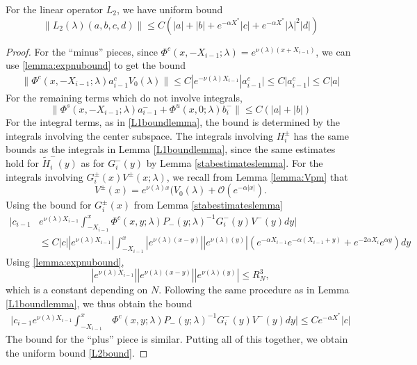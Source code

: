 \documentclass[thesis.tex]{subfiles}
\begin{document}
\begin{lemma}\label{L2boundlemma}
For the linear operator $L_2$, we have uniform bound
\begin{equation}\label{L2bound}
\| L_2(\lambda) (a,b,c,d) \| \leq C\left(|a| + |b| + e^{-\alpha X^*} |c| + e^{-\alpha X^*}|\lambda|^2|d|\right)
\end{equation}
\begin{proof}
For the ``minus'' pieces, since $\Phi^c(x, -X_{i-1}; \lambda) = e^{\nu(\lambda)(x + X_{i-1})}$, we can use \cref{lemma:expnubound} to get the bound
\begin{align*}
\| \Phi^c(x, -X_{i-1}; \lambda) a_{i-1}^c V_0(\lambda) \| \leq C |e^{-\nu(\lambda)X_{i-1}}|a_{i-1}^c| \leq C |a_{i-1}^c| \leq C |a|
\end{align*}
For the remaining terms which do not involve integrals,
\[
\| \Phi^s(x, -X_{i-1}; \lambda) a_{i-1}^- + \Phi^u(x, 0; \lambda) b_i^- \| \leq C(|a| + |b|)
\]
For the integral terms, as in \cref{L1boundlemma}, the bound is determined by the integrals involving the center subspace. The integrals involving $H_i^\pm$ has the same bounds as the integrals in Lemma \ref{L1boundlemma}, since the same estimates hold for $\tilde{H}_i^-(y)$ as for $G_i^-(y)$ by Lemma \ref{stabestimateslemma}. For the integrals involving $G_i^\pm(x) V^\pm(x; \lambda)$, we recall from Lemma \ref{lemma:Vpm} that
\[
V^\pm(x) = e^{\nu(\lambda)x}(V_0(\lambda) + \mathcal{O}(e^{-\alpha |x| }).
\]
Using the bound for $G_i^\pm(x)$ from Lemma \ref{stabestimateslemma}
\begin{align*}
\Bigg| c_{i-1} &e^{\nu(\lambda)X_{i-1}} \int_{-X_{i-1}}^x \Phi^c(x, y; \lambda) P_-(y; \lambda)^{-1} G_i^-(y) V^-(y) dy \Bigg| \\ 
&\leq C |c| \left| e^{\nu(\lambda)X_{i-1}} \right| \int_{-X_{i-1}}^x \left| e^{\nu(\lambda)(x - y)} \right| \left|e^{\nu(\lambda)(y)}\right| \left( e^{-\alpha X_{i-1}} e^{-\alpha(X_{i-1} + y) } + e^{-2 \alpha X_i} e^{\alpha y} \right) dy
\end{align*}
Using \cref{lemma:expnubound}, 
\[
\left| e^{\nu(\lambda)X_{i-1}} \right| \left| e^{\nu(\lambda)(x - y)} \right| \left|e^{\nu(\lambda)(y)}\right| \leq R_N^3,
\]
which is a constant depending on $N$. Following the same procedure as in Lemma \ref{L1boundlemma}, we thus obtain the bound
\begin{align}\label{intGVpmbound}
\Bigg| c_{i-1} e^{\nu(\lambda)X_{i-1}} \int_{-X_{i-1}}^x &\Phi^c(x, y; \lambda) P_-(y; \lambda)^{-1} G_i^-(y) V^-(y) dy \Bigg| \leq C e^{-\alpha X^*} |c| 
\end{align}
The bound for the ``plus'' piece is similar. Putting all of this together, we obtain the uniform bound \cref{L2bound}.
\end{proof}
\end{lemma}
\end{document}
